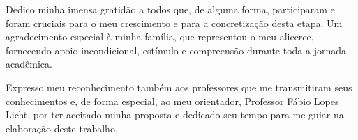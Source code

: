 \thispagestyle{empty}
\null
\vfill
\begin{flushright}
Dedico minha imensa gratidão a todos que, de alguma forma, participaram e foram cruciais para o meu crescimento e para a concretização desta etapa. Um agradecimento especial à minha família, que representou o meu alicerce, fornecendo apoio incondicional, estímulo e compreensão durante toda a jornada acadêmica.

Expresso meu reconhecimento também aos professores que me transmitiram seus conhecimentos e, de forma especial, ao meu orientador, Professor Fábio Lopes Licht, por ter aceitado minha proposta e dedicado seu tempo para me guiar na elaboração deste trabalho.

\end{flushright}
